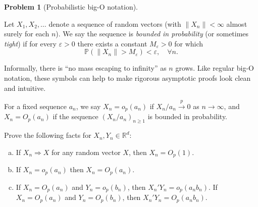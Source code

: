 \documentclass{article}
\newcommand{\PP}{\mathbb{P}}
\newcommand{\RR}{\mathbb{R}}
\newcommand{\toProb}{\overset{p}{\to}}
\newcommand{\ep}{\varepsilon}
\theoremstyle{definition}
\newtheorem{problem}{Problem}
\begin{document}
% 






\begin{problem}[Probabilistic big-O notation]
\label{prob:bigO}

Let $X_1,X_2,\ldots$ denote a sequence of random vectors (with $\|X_n\| <\infty$ almost surely for each $n$). We say the sequence is {\em bounded in probability} (or sometimes {\em tight}) if for every $\ep>0$ there exists a constant $M_\ep > 0$ for which
\[
\PP(\|X_n\| > M_\ep) < \ep, \quad \forall n.
\]

Informally, there is ``no mass escaping to infinity'' as $n$ grows. Like regular big-O notation, these symbols can help to make rigorous asymptotic proofs look clean and intuitive.

For a fixed sequence $a_n$, we say $X_n = o_p(a_n)$ if $X_n/a_n \toProb 0$ as $n\to \infty$, and $X_n = O_p(a_n)$ if the sequence $(X_n/a_n)_{n\geq 1}$ is bounded in probability.

Prove the following facts for $X_n, Y_n \in \RR^d$:

\begin{enumerate}[(a)]
\item If $X_n \Rightarrow X$ for any random vector $X$, then $X_n = O_p(1)$.


\item If $X_n = o_p(a_n)$ then $X_n = O_p(a_n)$.




% 



% 



\item If $X_n = O_p(a_n)$ and $Y_n = o_p(b_n)$, then $X_n'Y_n = o_p(a_n b_n)$. If $X_n = O_p(a_n)$ and $Y_n = O_p(b_n)$, then $X_n'Y_n = O_p(a_n b_n)$.




\end{enumerate}
\end{problem}
\end{document}

